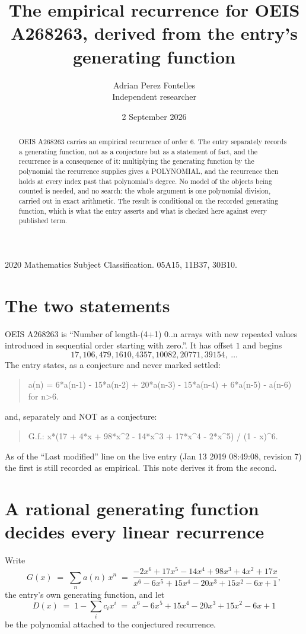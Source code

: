 \documentclass[11pt,a4paper]{article}
\title{The empirical recurrence for OEIS A268263, derived from the entry's generating function}
\author{Adrian Perez Fontelles\\ \small Independent researcher}
\date{2 September 2026}
\theoremstyle{plain}
\theoremstyle{definition}
\begin{document}
\maketitle

\begin{abstract}
OEIS A268263 carries an empirical recurrence of order $6$. The entry separately records a
generating function, not as a conjecture but as a statement of fact, and the recurrence is a
consequence of it: multiplying the generating function by the polynomial the recurrence
supplies gives a POLYNOMIAL, and the recurrence then holds at every index past that
polynomial's degree. No model of the objects being counted is needed, and no search: the
whole argument is one polynomial division, carried out in exact arithmetic. The result is
conditional on the recorded generating function, which is what the entry asserts and what is
checked here against every published term.
\end{abstract}

\noindent\small 2020 Mathematics Subject Classification. 05A15, 11B37, 30B10.\normalsize

\section{The two statements}

OEIS A268263 is ``Number of length-(4+1) 0..n arrays with new repeated values introduced in sequential order starting with zero.''. It has offset $1$ and begins
\[
17, 106, 479, 1610, 4357, 10082, 20771, 39154,\ \dots
\]
The entry states, as a conjecture and never marked settled:
\begin{quote}
a(n) = 6*a(n-1) - 15*a(n-2) + 20*a(n-3) - 15*a(n-4) + 6*a(n-5) - a(n-6) for n>6.
\end{quote}
and, separately and NOT as a conjecture:
\begin{quote}
G.f.: x*(17 + 4*x + 98*x\^{}2 - 14*x\^{}3 + 17*x\^{}4 - 2*x\^{}5) / (1 - x)\^{}6.
\end{quote}
As of the ``Last modified'' line on the live entry (Jan 13 2019 08:49:08, revision 7) the first is still
recorded as empirical. This note derives it from the second.

\section{A rational generating function decides every linear recurrence}

Write
\[
G(x)\;=\;\sum_{n}a(n)\,x^{n}\;=\;\frac{- 2 x^{6} + 17 x^{5} - 14 x^{4} + 98 x^{3} + 4 x^{2} + 17 x}{x^{6} - 6 x^{5} + 15 x^{4} - 20 x^{3} + 15 x^{2} - 6 x + 1},
\]
the entry's own generating function, and let
\[
D(x)\;=\;1-\sum_i c_i x^{i}\;=\;x^{6} - 6 x^{5} + 15 x^{4} - 20 x^{3} + 15 x^{2} - 6 x + 1
\]
be the polynomial attached to the conjectured recurrence.
\end{document}
